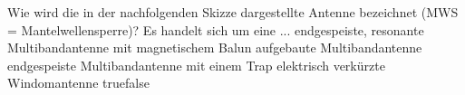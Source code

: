     {Wie wird die in der nachfolgenden Skizze dargestellte Antenne bezeichnet (MWS = Mantelwellensperre)? Es handelt sich um eine ...}
    {endgespeiste, resonante Multibandantenne}
    {mit magnetischem Balun aufgebaute Multibandantenne}
    {endgespeiste Multibandantenne mit einem Trap}
    {elektrisch verkürzte Windomantenne}
    {true}{false}